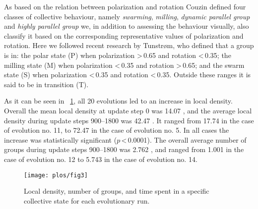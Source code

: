 As based on the relation between polarization and rotation Couzin\etal \cite{couzin2002collective} defined four classes of collective behaviour, namely \emph{swarming}, \emph{milling}, \emph{dynamic parallel group} and \emph{highly parallel group} we, in addition to assessing the behaviour visually, also classify it based on the corresponding representative values of polarization and rotation. Here we followed recent research by Tunstrøm\etal \cite{tunstrom2013collective}, who defined that a group is in: the polar state (P) when polarization \textgreater\,\num{0.65} and rotation \textless\,\num{0.35}; the milling state (M) when polarization \textless\,\num{0.35} and rotation \textgreater\,\num{0.65}; and the swarm state (S) when polarization \textless\,\num{0.35} and rotation \textless\,\num{0.35}. Outside these ranges it is said to be in transition (T).

As it can be seen in \figurename~\ref{fig3}, all 20 evolutions led to an increase in local density. Overall the mean local density at update step 0 was \num{14.07} , and the average local density during update steps \numrange{900}{1800} was \num{42.47} . It ranged from \num{17.74}  in the case of evolution no. 11, to \num{72.47}  in the case of evolution no. 5. In all cases the increase was statistically significant ($p$\,\textless\,\num{0.0001}). The overall average number of groups during update steps \numrange{900}{1800} was \num{2.762} , and ranged from \num{1.001}  in the case of evolution no. 12 to \num{5.743}  in the case of evolution no. 14.

\begin{figure}
	\texttt{[image: plos/fig3]}
	\caption{Local density, number of groups, and time spent in a specific collective state for each evolutionary run.}
	\label{fig3}
\end{figure}

